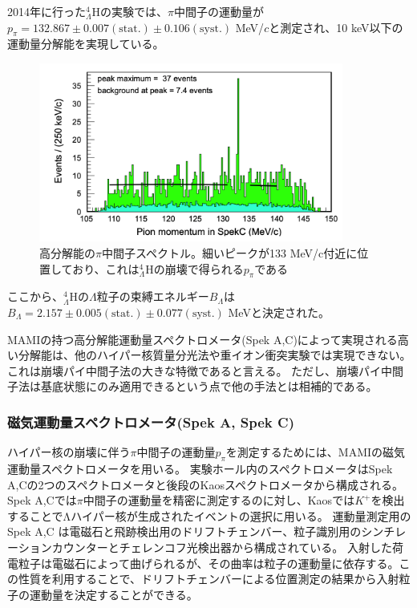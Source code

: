 \documentclass[a4paper,11pt,uplatex]{jsbook}
\begin{document}
2014年に行った$^4_{\Lambda}\text{H}$の実験\cite{Schulz2015}では、$\pi$中間子の運動量が
$p_\pi = 132.867 \pm 0.007(\text{stat.}) \pm 0.106(\text{syst.})$ MeV/$c$と測定され、10 keV以下の運動量分解能を実現している。
\begin{figure}[b]
  \centering
  \includegraphics[width=10cm]{image/1-PionSpectrum.png}
  \caption[過去実験での$p_\pi$スペクトル]{高分解能の$\pi$中間子スペクトル。細いピークが133 MeV/c付近に位置しており、これは$^4_{\Lambda}\text{H}$の崩壊で得られる$p_\pi$である\cite{Schulz2015}}
\end{figure}

ここから、$^4_{\Lambda}\text{H}$の$\Lambda$粒子の束縛エネルギー$B_\Lambda$は$B_\Lambda = 2.157 \pm 0.005(\text{stat.}) \pm 0.077(\text{syst.})$ MeVと決定された。

MAMIの持つ高分解能運動量スペクトロメータ(Spek A,C)によって実現される高い分解能は、他のハイパー核質量分光法や重イオン衝突実験では実現できない。
これは崩壊パイ中間子法の大きな特徴であると言える。
ただし、崩壊パイ中間子法は基底状態にのみ適用できるという点で他の手法とは相補的である。

\subsubsection{磁気運動量スペクトロメータ(Spek A, Spek C)}
ハイパー核の崩壊に伴う$\pi$中間子の運動量$p_\pi$を測定するためには、MAMIの磁気運動量スペクトロメータを用いる。
実験ホール内のスペクトロメータはSpek A,Cの2つのスペクトロメータと後段のKaosスペクトロメータから構成される。Spek A,Cでは$\pi$中間子の運動量を精密に測定するのに対し、Kaosでは$K^+$を検出することでΛハイパー核が生成されたイベントの選択に用いる。
運動量測定用のSpek A,C は電磁石と飛跡検出用のドリフトチェンバー、粒子識別用のシンチレーションカウンターとチェレンコフ光検出器から構成されている。
入射した荷電粒子は電磁石によって曲げられるが、その曲率は粒子の運動量に依存する。この性質を利用することで、ドリフトチェンバーによる位置測定の結果から入射粒子の運動量を決定することができる。
\end{document}
